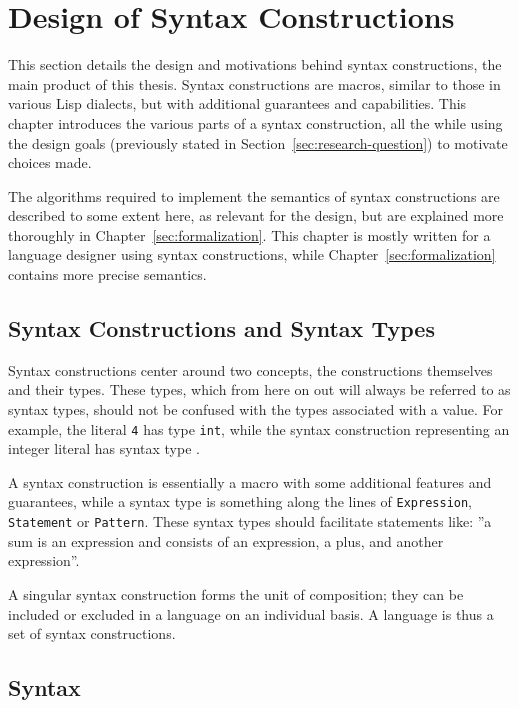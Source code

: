 \documentclass{kththesis}
\begin{document}
\chapter{Design of Syntax Constructions} \label{sec:syntax-constructions}

This section details the design and motivations behind syntax constructions, the main product of this thesis. Syntax constructions are macros, similar to those in various Lisp dialects, but with additional guarantees and capabilities. This chapter introduces the various parts of a syntax construction, all the while using the design goals (previously stated in Section~\ref{sec:research-question}) to motivate choices made.

The algorithms required to implement the semantics of syntax constructions are described to some extent here, as relevant for the design, but are explained more thoroughly in Chapter~\ref{sec:formalization}. This chapter is mostly written for a language designer using syntax constructions, while Chapter~\ref{sec:formalization} contains more precise semantics.

\section{Syntax Constructions and Syntax Types} \label{sec:constructions-and-types}

Syntax constructions center around two concepts, the constructions themselves and their types. These types, which from here on out will always be referred to as syntax types, should not be confused with the types associated with a value. For example, the literal \texttt{4} has type \texttt{int}, while the syntax construction representing an integer literal has syntax type .

A syntax construction is essentially a macro with some additional features and guarantees, while a syntax type is something along the lines of \texttt{Expression}, \texttt{Statement} or \texttt{Pattern}. These syntax types should facilitate statements like: ''a sum is an expression and consists of an expression, a plus, and another expression''.

A singular syntax construction forms the unit of composition; they can be included or excluded in a language on an individual basis. A language is thus a set of syntax constructions.

\section{Syntax} \label{sec:design-syntax}
\end{document}
